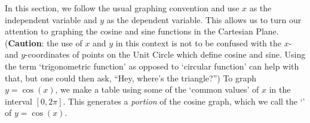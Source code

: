  
In this section, we follow the usual graphing convention  and use $x$ as the independent variable and $y$ as the dependent variable. This allows us to turn our attention to graphing the cosine and sine functions in the Cartesian Plane. (\textbf{Caution}: the use of $x$ and $y$ in this context is not to be confused with the $x$- and $y$-coordinates of points on the Unit Circle which define cosine and sine.  Using the term `trigonometric function' as opposed to `circular function' can help with that, but one could then ask, ``Hey, where's the triangle?'') To graph $y = \cos(x)$, we make a table using some of the `common values' of $x$ in the interval $[0,2\pi]$. This generates a \textit{portion} of the cosine graph, which we call the `' of $y = \cos(x)$. 


